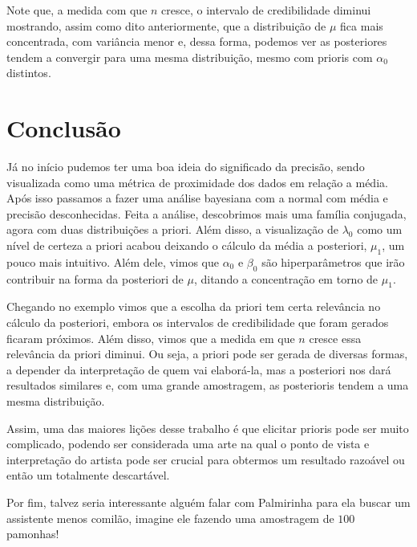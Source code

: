 \documentclass{article}
\begin{document}
Note que, a medida com que $n$ cresce, o intervalo de credibilidade diminui mostrando, assim como dito anteriormente, que a distribuição de $\mu$ fica mais concentrada, com variância menor e, dessa forma, podemos ver as posteriores tendem a convergir para uma mesma distribuição, mesmo com prioris com $\alpha_0$ distintos.

\section*{Conclusão}

Já no início pudemos ter uma boa ideia do significado da precisão, sendo visualizada como uma métrica de proximidade dos dados em relação a média. Após isso passamos a fazer uma análise bayesiana com a normal com média e precisão desconhecidas. Feita a análise, descobrimos mais uma família conjugada, agora com duas distribuições a priori. Além disso, a visualização de $\lambda_0$ como um nível de certeza a priori acabou deixando o cálculo da média a posteriori, $\mu_1$, um pouco mais intuitivo. Além dele, vimos que $\alpha_0$ e $\beta_0$ são hiperparâmetros que irão contribuir na forma da posteriori de $\mu$, ditando a concentração em torno de $\mu_1$.

Chegando no exemplo vimos que a escolha da priori tem certa relevância no cálculo da posteriori, embora os intervalos de credibilidade que foram gerados ficaram próximos. Além disso, vimos que a medida em que $n$ cresce essa relevância  da priori diminui. Ou seja, a priori pode ser gerada de diversas formas, a depender da interpretação de quem vai elaborá-la, mas a posteriori nos dará resultados similares e, com uma grande amostragem, as posterioris tendem a uma mesma distribuição.

Assim, uma das maiores lições desse trabalho é que elicitar prioris pode ser muito complicado, podendo ser considerada uma arte na qual o ponto de vista e interpretação do artista pode ser crucial para obtermos um resultado razoável ou então um totalmente descartável.

Por fim, talvez seria interessante alguém falar com Palmirinha para ela buscar um assistente menos comilão, imagine ele fazendo uma amostragem de $100$ pamonhas!

\printbibliography
\end{document}
